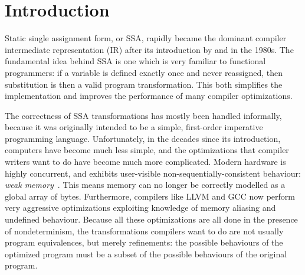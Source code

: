 \documentclass[acmsmall,screen,review]{acmart}
\begin{document}

\maketitle

\section{Introduction}

Static single assignment form, or SSA, rapidly became the dominant compiler intermediate
representation (IR) after its introduction by \citet{alpern-ssa-original-88} and
\citet{rosen-gvn-1988} in the 1980s. The fundamental idea behind SSA is one which is very familiar
to functional programmers: if a variable is defined exactly once and never reassigned, then
substitution is then a valid program transformation. This both simplifies the implementation and
improves the performance of many compiler optimizations.

The correctness of SSA transformations has mostly been handled informally, because it was originally
intended to be a simple, first-order imperative programming language. Unfortunately, in the decades
since its introduction, computers have become much less simple, and the optimizations that compiler
writers want to do have become much more complicated. Modern hardware is highly concurrent, and
exhibits user-visible non-sequentially-consistent behaviour: \emph{weak
memory}~\cite{batty-compositional-17}. This means memory can no longer be correctly modelled as a
global array of bytes. Furthermore, compilers like LLVM and GCC now perform very aggressive
optimizations exploiting knowledge of memory aliasing and undefined behaviour.
Because all these optimizations are all done in the presence of nondeterminism, the transformations
compilers want to do are not usually program equivalences, but merely refinements: the possible
behaviours of the optimized program must be a subset of the possible behaviours of the original
program.
\end{document}

